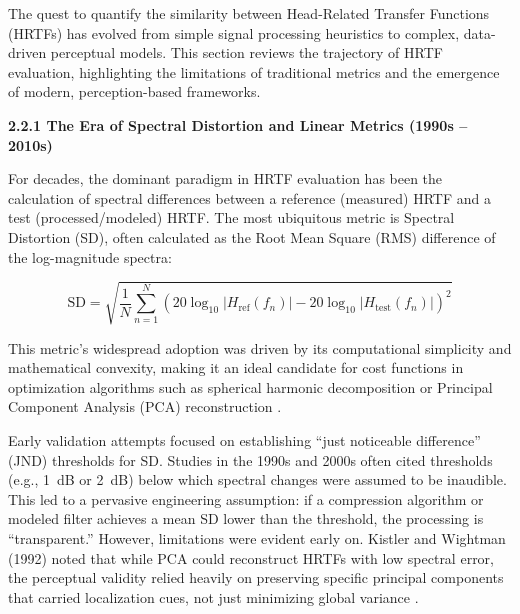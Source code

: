 \documentclass[12pt,a4paper]{article}
\begin{document}
The quest to quantify the similarity between Head-Related Transfer Functions (HRTFs) has evolved from simple signal processing heuristics to complex, data-driven perceptual models. This section reviews the trajectory of HRTF evaluation, highlighting the limitations of traditional metrics and the emergence of modern, perception-based frameworks.

\textbf{2.2.1 The Era of Spectral Distortion and Linear Metrics (1990s -- 2010s)}

For decades, the dominant paradigm in HRTF evaluation has been the calculation of spectral differences between a reference (measured) HRTF and a test (processed/modeled) HRTF. The most ubiquitous metric is Spectral Distortion (SD), often calculated as the Root Mean Square (RMS) difference of the log-magnitude spectra:

\begin{equation}
\mathrm{SD} = \sqrt{\frac{1}{N} \sum_{n=1}^{N} \left( 20 \log_{10} |H_{\mathrm{ref}}(f_n)| - 20 \log_{10} |H_{\mathrm{test}}(f_n)| \right)^2}
\label{eq:sd}
\end{equation}

This metric's widespread adoption was driven by its computational simplicity and mathematical convexity, making it an ideal candidate for cost functions in optimization algorithms such as spherical harmonic decomposition or Principal Component Analysis (PCA) reconstruction \cite{asaudio2025}.

Early validation attempts focused on establishing ``just noticeable difference'' (JND) thresholds for SD. Studies in the 1990s and 2000s often cited thresholds (e.g., 1~dB or 2~dB) below which spectral changes were assumed to be inaudible. This led to a pervasive engineering assumption: if a compression algorithm or modeled filter achieves a mean SD lower than the threshold, the processing is ``transparent.'' However, limitations were evident early on. Kistler and Wightman (1992) noted that while PCA could reconstruct HRTFs with low spectral error, the perceptual validity relied heavily on preserving specific principal components that carried localization cues, not just minimizing global variance \cite{kistler1992}.
\end{document}
